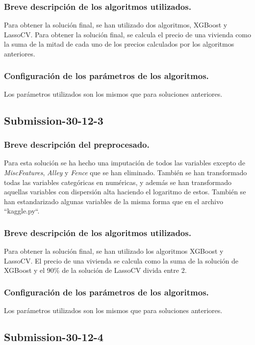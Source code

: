 	\subsubsection{Breve descripción de los algoritmos utilizados.}
	Para obtener la solución final, se han utilizado dos algoritmos, XGBoost y LassoCV. Para obtener la solución final, se calcula el precio de una vivienda como la suma de la mitad de cada uno de los precios calculados por los algoritmos anteriores.
	\subsubsection{Configuración de los parámetros de los algoritmos.}
	Los parámetros utilizados son los mismos que para soluciones anteriores.
	
	\subsection{Submission-30-12-3}
	\subsubsection{Breve descripción del preprocesado.}
	Para esta solución se ha hecho una imputación de todos las variables excepto de \textit{MiscFeatures}, \textit{Alley} y \textit{Fence} que se han eliminado. También se han transformado todas las variables categóricas en numéricas, y además se han transformado aquellas variables con dispersión alta haciendo el logaritmo de estos. También se han estandarizado algunas variables de la misma forma que en el archivo ``kaggle.py``.
	\subsubsection{Breve descripción de los algoritmos utilizados.}
	Para obtener la solución final, se han utilizado los algoritmos XGBoost y LassoCV. El precio de una vivienda se calcula como la suma de la solución de XGBoost y el 90\% de la solución de LassoCV divida entre 2.
	\subsubsection{Configuración de los parámetros de los algoritmos.}
	Los parámetros utilizados son los mismos que para soluciones anteriores.
	
	\subsection{Submission-30-12-4}
